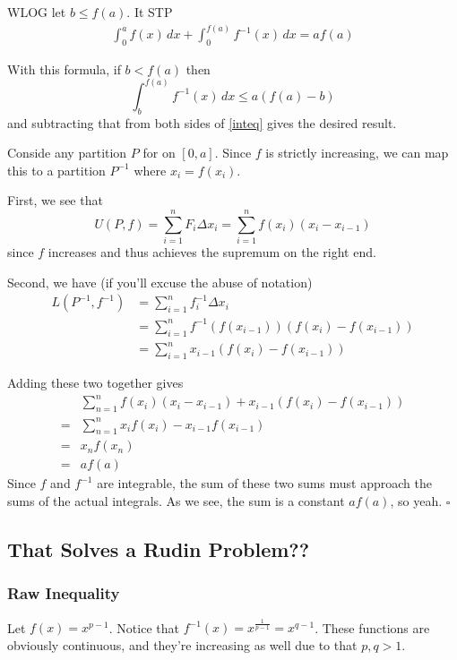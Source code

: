 \documentclass[12pt]{article}
\begin{document}
WLOG let $b \le f(a)$.
It STP
\begin{gather}
  \label{inteq} \int_{0}^{a} f(x)\,dx + \int_{0}^{f(a)} f^{-1}(x)\,dx = af(a)
\end{gather}

With this formula, if $b < f(a)$ then
\[\int_{b}^{f(a)} f^{-1}(x)\,dx \le a(f(a)-b)\]
and subtracting that from both sides of \eqref{inteq} gives the desired result.

Conside any partition $P$ for on $[0, a]$.
Since $f$ is strictly increasing, we can map this to a partition $P^{-1}$ where $x_i=f(x_i)$.

First, we see that
\[U(P, f)
  =\sum_{i=1}^{n} F_i \Delta x_i
  = \sum_{i=1}^{n} f(x_i)(x_i - x_{i-1})\]
since $f$ increases and thus achieves the supremum on the right end.

Second, we have (if you'll excuse the abuse of notation)
\begin{align*}
  L\left(P^{-1}, f^{-1}\right)
   & = \sum_{i=1}^{n} f^{-1}_i \Delta x_i                   \\
   & = \sum_{i=1}^{n} f^{-1}(f(x_{i-1}))(f(x_i)-f(x_{i-1})) \\
   & = \sum_{i=1}^{n} x_{i-1}(f(x_i)-f(x_{i-1}))
\end{align*}

Adding these two together gives
\begin{align*}
      & \sum_{n=1}^{n} f(x_i)(x_i-x_{i-1})+x_{i-1}(f(x_i)-f(x_{i-1})) \\
  ={} & \sum_{n=1}^{n} x_i f(x_i) - x_{i-1} f(x_{i-1})                \\
  ={} & x_n f(x_n)                                                    \\
  ={} & a f(a)
\end{align*}
Since $f$ and $f^{-1}$ are integrable, the sum of these
two sums must approach the sums of the actual integrals.
As we see, the sum is a constant $a f(a)$, so yeah. $\square$

\pagebreak

\subsection{That Solves a Rudin Problem??}

\subsubsection{Raw Inequality}

Let $f(x)=x^{p-1}$.
Notice that $f^{-1}(x)=x^{\frac{1}{p-1}}=x^{q-1}$.
These functions are obviously continuous, and they're increasing as well due to that $p, q > 1$.
\end{document}
